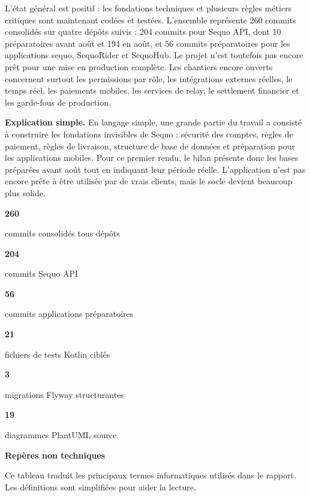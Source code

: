 \documentclass[11pt,letterpaper]{article}
\newcommand{\sectiontitle}[1]{%
  \vspace{0.55em}
  {\Large\bfseries\color{SequoInk}#1}\par
  \vspace{0.1em}
}
\newcommand{\simpleexplanation}[1]{%
  {\small\textbf{\color{SequoBlue}Explication simple.} \color{SequoMuted}#1\par}
}
\newcommand{\metric}[2]{%
  \begin{minipage}[t]{0.30\linewidth}
    {\LARGE\bfseries\color{SequoGreen}#1}\par
    {\small\color{SequoMuted}#2}
  \end{minipage}
}
\begin{document}
L'état général est positif : les fondations techniques et plusieurs règles métiers critiques sont maintenant codées et testées. L'ensemble représente 260 commits consolidés sur quatre dépôts suivis : 204 commits pour Sequo API, dont 10 préparatoires avant août et 194 en août, et 56 commits préparatoires pour les applications sequo, SequoRider et SequoHub. Le projet n'est toutefois pas encore prêt pour une mise en production complète. Les chantiers encore ouverts concernent surtout les permissions par rôle, les intégrations externes réelles, le temps réel, les paiements mobiles, les services de relay, le settlement financier et les garde-fous de production.

\simpleexplanation{En langage simple, une grande partie du travail a consisté à construire les fondations invisibles de Sequo : sécurité des comptes, règles de paiement, règles de livraison, structure de base de données et préparation pour les applications mobiles. Pour ce premier rendu, le bilan présente donc les bases préparées avant août tout en indiquant leur période réelle. L'application n'est pas encore prête à être utilisée par de vrais clients, mais le socle devient beaucoup plus solide.}

\vspace{0.45em}
\noindent
\metric{260}{commits consolidés tous dépôts}
\hfill
\metric{204}{commits Sequo API}
\hfill
\metric{56}{commits applications préparatoires}
\par\vspace{0.65em}
\noindent
\metric{21}{fichiers de tests Kotlin ciblés}
\hfill
\metric{3}{migrations Flyway structurantes}
\hfill
\metric{19}{diagrammes PlantUML source}

\sectiontitle{Repères non techniques}
Ce tableau traduit les principaux termes informatiques utilisés dans le rapport. Les définitions sont simplifiées pour aider la lecture.
\end{document}
